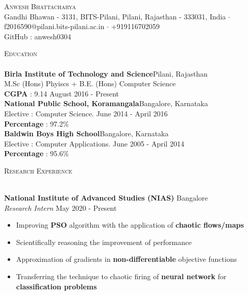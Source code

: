 \documentclass[a4paper]{article}
\newcommand{\lineunder} {
    \vspace*{-8pt} \\
    \hspace*{-18pt} \hrulefill \\
}
\newcommand{\header} [1] {
    {\hspace*{-18pt}\vspace*{6pt} \textsc{#1}}
    \vspace*{-6pt} \lineunder
}
\begin{document}
\vspace*{-40pt}

    

\vspace*{-10pt}
\begin{center}
	{\Huge \scshape {Anwesh Bhattacharya}}\\
	Gandhi Bhawan - 3131, BITS-Pilani, Pilani, Rajasthan - 333031, India $\cdot$ f2016590@pilani.bits-pilani.ac.in $\cdot$ +919116702059\\
	GitHub : anwesh0304
	
\end{center}

\header{Education}
\textbf{Birla Institute of Technology and Science}\hfill Pilani, Rajasthan\\
M.Sc (Hons) Phyiscs + B.E. (Hons) Computer Science \\
\textbf{CGPA} : 9.14 \hfill August 2016 - Present\\
\vspace{2mm}
\textbf{National Public School, Koramangala}\hfill Bangalore, Karnataka\\
Elective : Computer Science. \hfill June 2014 - April 2016\\
\textbf{Percentage} : 97.2\% \\
\vspace{2mm}
\textbf{Baldwin Boys High School}\hfill Bangalore, Karnataka\\
Elective : Computer Applications. \hfill June 2005 - April 2014\\
\textbf{Percentage} : 95.6\% \\
\vspace{2mm}

\header{Research Experience}
\vspace{1mm}

\textbf{National Institute of Advanced Studies (NIAS)} \hfill Bangalore\\
\textit{Research Intern} \hfill May 2020 - Present\\
\vspace{-1mm}
\begin{itemize} \itemsep 1pt
	\item Improving \textbf{PSO} algorithm with the application of \textbf{chaotic flows/maps}
	\item Scientifically reasoning the improvement of performance
	\item Approximation of gradients in \textbf{non-differentiable} objective functions
	\item Transferring the technique to chaotic firing of \textbf{neural network} for \textbf{classification problems}
\end{itemize}
\end{document}
